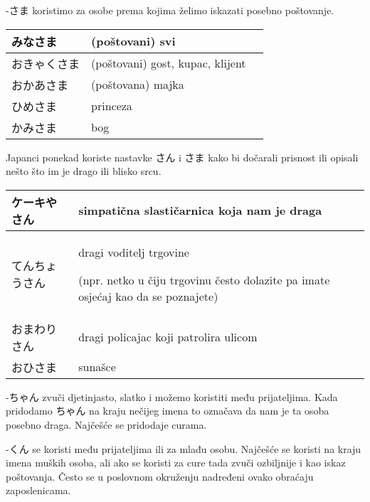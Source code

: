 	
	\newpage
	
	-さま koristimo za osobe prema kojima želimo iskazati posebno poštovanje.
	
	\vspace{10pt}
	
	\begin{tabular}{|l|l|l|}
		\hline
		みなさま&(poštovani) svi\\\hline
		おきゃくさま&(poštovani) gost, kupac, klijent\\\hline
		おかあさま&(poštovana) majka\\\hline
		ひめさま&princeza\\\hline
		かみさま&bog\\\hline
	\end{tabular}
	
	\vspace{10pt}
	
	
	Japanci ponekad koriste nastavke さん i さま kako bi dočarali prisnost ili opisali nešto što im je drago ili blisko srcu.
	
	\vspace{10pt}	
	

\begin{tabular}{|l|p{400pt}|}
		\hline
		ケーキやさん&simpatična slastičarnica koja nam je draga\\\hline
		てんちょうさん&dragi voditelj trgovine 
		
		(npr. netko u čiju trgovinu često dolazite pa imate osjećaj kao da se poznajete)\\\hline
		おまわりさん&dragi policajac koji patrolira ulicom\\\hline
		おひさま&sunašce\\\hline
	\end{tabular}

	\vspace{10pt}	
	
	-ちゃん zvuči djetinjasto, slatko i možemo koristiti među prijateljima. Kada pridodamo ちゃん na kraju nečijeg imena to označava da nam je ta osoba posebno draga. Najčešće se pridodaje curama.
	
	\vspace{10pt}	
	
	-くん se koristi među prijateljima ili za mlađu osobu. Najčešće se koristi na kraju imena muških osoba, ali ako se koristi za cure tada zvuči ozbiljnije i kao iskaz poštovanja. Često se u poslovnom okruženju nadređeni ovako obraćaju zaposlenicama.
	
